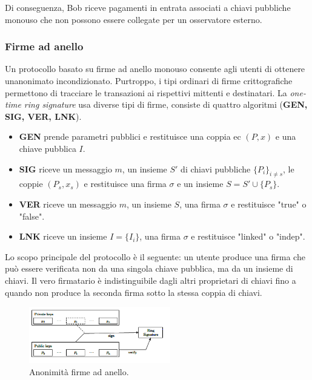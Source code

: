 Di conseguenza, Bob riceve pagamenti in entrata associati a chiavi
pubbliche monouso che non possono essere collegate per un osservatore
esterno.

\subsubsection{Firme ad anello}\label{firme-ad-anello}

Un protocollo basato su firme ad anello monouso consente agli utenti di
ottenere un\textquotesingle anonimato incondizionato. Purtroppo, i tipi
ordinari di firme crittografiche permettono di tracciare le transazioni
ai rispettivi mittenti e destinatari. La \emph{one-time ring signature}
usa diverse tipi di firme, consiste di quattro algoritmi (\textbf{GEN,
SIG, VER, LNK}).

\begin{itemize}
  \item
    \textbf{GEN} prende parametri pubblici e restituisce una coppia ec
    \emph{$(P, x)$} e una chiave pubblica $I$.
  \item
    \textbf{SIG} riceve un messaggio $m$, un insieme $S'$ di chiavi pubbliche
    $\{P_i\}_{i \neq s}$, le coppie \emph{$(P_s, x_s)$} e restituisce una firma $\sigma$ e un
    insieme $S = S' \cup \{P_s\}$.
  \item
    \textbf{VER} riceve un messaggio $m$, un insieme $S$, una firma $\sigma$ e
    restituisce "true" o "false".
  \item
    \textbf{LNK} riceve un insieme $I = \{I_i\}$, una firma $\sigma$ e restituisce
    "linked" o "indep".
\end{itemize}

Lo scopo principale del protocollo è il seguente: un utente produce una
firma che può essere verificata non da una singola chiave pubblica, ma
da un insieme di chiavi. Il vero firmatario è indistinguibile dagli
altri proprietari di chiavi fino a quando non produce la seconda firma
sotto la stessa coppia di chiavi.

\begin{figure}[h]
  \centering
  \includegraphics[width = 0.55\textwidth]{image5.png}
  \caption{Anonimità firme ad anello.}
\end{figure}

